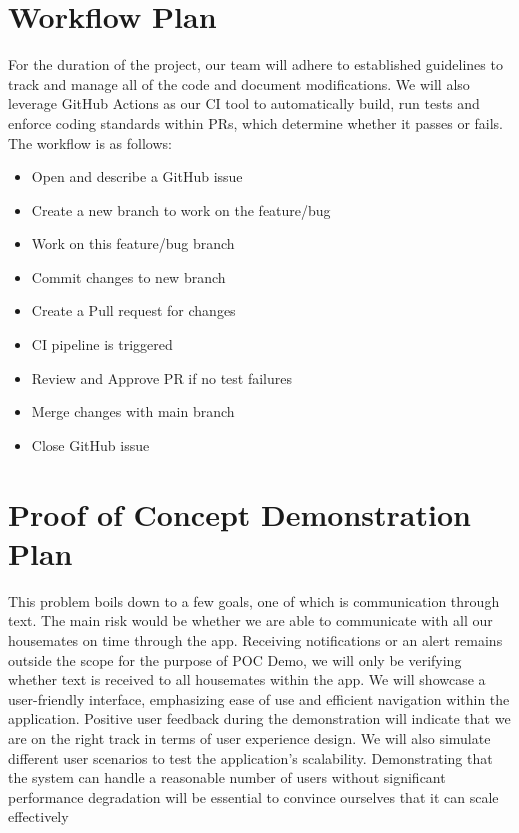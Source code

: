\documentclass{article}
\begin{document}
\section{Workflow Plan}
    For the duration of the project, our team will adhere to established guidelines to track and manage all of the code and document modifications. We will also leverage GitHub Actions as our CI tool to automatically build, run tests and enforce coding standards within PRs, which determine whether it passes or fails. The workflow is as follows:
    \begin{itemize}
        \item Open and describe a GitHub issue
        \item Create a new branch to work on the feature/bug
        \item Work on this feature/bug branch
        \item Commit changes to new branch
        \item Create a Pull request for changes
        \item CI pipeline is triggered
        \item Review and Approve PR if no test failures
        \item Merge changes with main branch
        \item Close GitHub issue
    \end{itemize}
    

\section{Proof of Concept Demonstration Plan}
    This problem boils down to a few goals, one of which is communication through text. The main risk would be whether we are able to communicate with all our housemates on time through the app. Receiving notifications or an alert remains outside the scope for the purpose of POC Demo, we will only be verifying whether text is received to all housemates within the app.
    We will showcase a user-friendly interface, emphasizing ease of use and efficient navigation within the application. Positive user feedback during the demonstration will indicate that we are on the right track in terms of user experience design.
    We will also simulate different user scenarios to test the application's scalability. Demonstrating that the system can handle a reasonable number of users without significant performance degradation will be essential to convince ourselves that it can scale effectively
\end{document}
